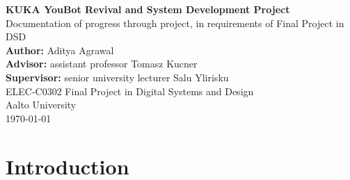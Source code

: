 \documentclass[a4paper, 12pt]{article}
\newcommand{\projectTitle}{KUKA YouBot Revival and System Development Project}
\newcommand{\projectSubtitle}{Documentation of progress through project, in requirements of Final Project in DSD}
\newcommand{\authorName}{Aditya Agrawal}
\newcommand{\advisorName}{assistant professor Tomasz Kucner}
\newcommand{\supervisorName}{senior university lecturer Salu Ylirisku}
\newcommand{\courseName}{ELEC-C0302 Final Project in Digital Systems and Design}
\newcommand{\universityName}{Aalto University}
\newcommand{\commentout}[1]{}
\begin{document}
    \begin{titlepage}
        \raggedright
        

        \vspace*{2cm}

        {\Huge \textbf{\projectTitle}}\\[0.5cm]
        {\Large \projectSubtitle}\\[2cm]

        \textbf{Author:} \authorName\\[0.3cm]
        \textbf{Advisor:} \advisorName\\[0.3cm]
        \textbf{Supervisor:} \supervisorName\\[2cm]

        \courseName \\
        \universityName\\[0.5cm]
        \today

        \vfill
    \end{titlepage}
    \romantableofcontents

    \commentout{\section{Ideas \& Drafts (NOT ON FINAL REPORT)}
    structure: 
    My work
    reflection
    appendix: user manual

    things I did i want to add:
    - add in the initial project plan
    - add in the initial state of everything
    - known documentation

    - libfreenect and kinect camera
    - communication with onboard computer
    - enabling it to initially move through provided demos
    - utilising ROS1-ROS2 bridge (fail)
    - fixing the battery up 
    - writing my own programs to move the bot 
    
    - how did my goals change with time?
    - project management brief overview
    Teach and repeat background:
    https://furgalep.github.io/bib/mcmanus_icra12.pdf
    https://www.sciencedirect.com/science/article/pii/S0921889020304176
    https://arxiv.org/pdf/2309.15405
    https://clearpathrobotics.com/blog/2018/07/visual-teach-and-repeat-closer-look-part-1/}

    
    
    \section{Introduction}
\end{document}
